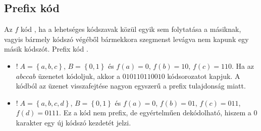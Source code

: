 \documentclass[../main.tex]{subfiles}
\begin{document}
\subsection{Prefix kód}

Az $f$ kód , ha a lehetséges kódszavak közül
egyik sem folytatása a másiknak, vagyis bármely kódszó
végéből bármekkora szegmenst levágva nem kapunk egy másik
kódszót. Prefix kód .
\begin{itemize}
	\item $! \; A = \left\{a, b, c\right\}$, $B = \left\{ 0, 1\right\}$
	      és $f(a) = 0$, $f(b) = 10$, $f(c) = 110$. Ha az $abccab$ üzenetet
	      kódoljuk, akkor a $010110110010$ kódsorozatot kapjuk. A kódból
	      az üzenet visszafejtése nagyon egyszerű a prefix tulajdonság miatt.

	\item  $! \; A = \left\{a, b, c, d\right\}$, $B = \left\{ 0, 1\right\}$
	      és $f(a) = 0$, $f(b) = 01$, $f(c) = 011$, $f(d)=0111$.
	      Ez a kód nem prefix, de egyértelműen dekódolható, hiszem a $0$
	      karakter egy új kódszó kezdetét jelzi.
\end{itemize}
\end{document}
